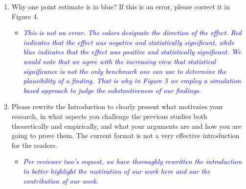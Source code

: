 \begin{enumerate}
\begin{itemize}
	\end{itemize}
	\item Why one point estimate is in blue? If this is an error, please correct it in Figure 4.	
	\begin{itemize}
		\item \textcolor{blue}{ \emph{ This is not an error. The colors designate the direction of the effect. Red indicates that the effect was negative and statistically significant, while blue indicates that the effect was positive and statistically significant. We would note that we agree with the increasing view that statistical significance is not the only benchmark one can use to determine the plausibility of a finding. That is why in Figure 5 we employ a simulation based approach to judge the substantiveness of our findings.  }}
	\end{itemize}
	\item Please rewrite the Introduction to clearly present what motivates your research, in what aspects you challenge the previous studies both theoretically and empirically, and what your arguments are and how you are going to prove them. The current format is not a very effective introduction for the readers.
	\begin{itemize}
		\item \textcolor{blue}{ \emph{
		Per reviewer two's request, we have thoroughly rewritten the introduction to better highlight the motivation of our work here and our the contribution of our work.
		}}
	\end{itemize}	
\end{enumerate}